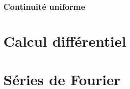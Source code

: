 \documentclass[a4paper, oneside]{report}
\begin{document}
\subsection{Continuité uniforme}














\chapter{Calcul différentiel}

\chapter{Séries de Fourier}
\end{document}
